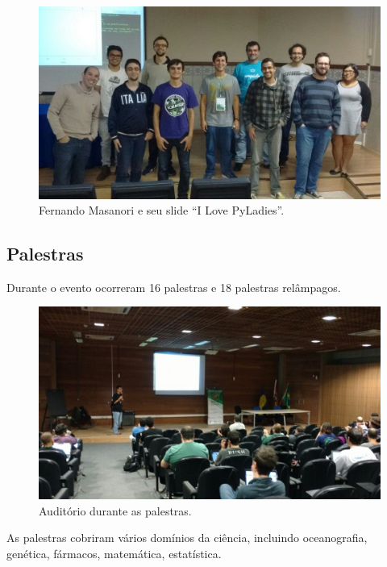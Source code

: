 \documentclass[12pt]{article}
\begin{document}
\noindent  %
\begin{figure}[!htb]
\center
\includegraphics[height=.3\textheight]{tutorial-rpy.jpg}
\caption{Fernando Masanori e seu slide ``I Love PyLadies''.}
\end{figure}

\subsection*{Palestras}

Durante o evento ocorreram 16 palestras e 18 palestras relâmpagos.

\begin{figure}[!htb]
\center
\includegraphics[height=.3\textheight]{talks-full.jpg}
\caption{Auditório durante as palestras.}
\end{figure}

As palestras cobriram vários domínios da ciência, incluindo
oceanografia,
genética,
fármacos,
matemática,
estatística.
\end{document}
